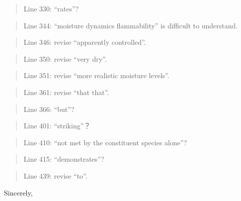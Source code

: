 \documentclass[letterpaper, 12pt]{letter}
\begin{document}
\begin{letter}{}
\begin{quote}
Line 330: “rates”?
\end{quote}

\begin{quote}
Line 344: “moisture dynamics flammability” is difficult to understand.
\end{quote}

\begin{quote}
Line 346: revise “apparently controlled”.
\end{quote}

\begin{quote}
Line 350: revise “very dry”.
\end{quote}

\begin{quote}
Line 351: revise “more realistic moisture levels”.
\end{quote}

\begin{quote}
Line 361: revise “that that”.
\end{quote}

\begin{quote}
Line 366: “but”?
\end{quote}

\begin{quote}
Line 401: “striking”？
\end{quote}

\begin{quote}
Line 410: “not met by the constituent species alone”?
\end{quote}

\begin{quote}
Line 415: “demonstrates”?
\end{quote}

\begin{quote}
Line 439: revise “to”.
\end{quote}

\closing{Sincerely,}

\end{letter}
\end{document}
